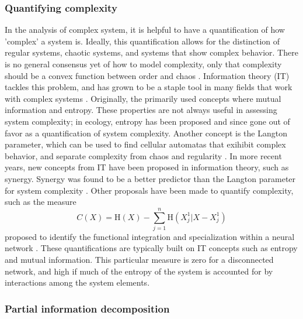 \documentclass[../main.tex]{subfiles}
\begin{document}
\subsubsection{Quantifying complexity}

In the analysis of complex system, it is helpful to have a quantification of how 'complex' a system is.
Ideally, this quantification allows for the distinction of regular systems, chaotic systems, and systems that show complex behavior.
There is no general consensus yet of how to model complexity, only that complexity should be a convex function between order and chaos \cite{bar2013computationally}.
Information theory (IT) tackles this problem, and has grown to be a staple tool in many fields that work with complex systems \cite{williams2010nonnegative}. %
Originally, the primarily used concepts where mutual information and entropy.
These properties are not always useful in assessing system complexity; in ecology, entropy has been proposed and since gone out of favor as a quantification of system complexity.
Another concept is the Langton parameter, which can be used to find cellular automatas that exihibit complex behavior, and separate complexity from chaos and regularity \cite{langton1990computation}.
In more recent years, new concepts from IT have been proposed in information theory, such as synergy.
Synergy was found to be a better predictor than the Langton parameter for system complexity \cite{9999QuaxChli}.
Other proposals have been made to quantify complexity, such as the measure
%
\begin{equation}
C(X) = \mathrm{H}(X) - \sum_{j=1}^n \mathrm{H}(X_j^1 | X - X_j^1)
\end{equation}
%
proposed to identify the functional integration and specialization within a neural network \cite{tononi1999measures}.
These quantifications are typically built on IT concepts such as entropy and mutual information.
This particular measure is zero for a disconnected network, and high if much of the entropy of the system is accounted for by interactions among the system elements.

\subsubsection{Partial information decomposition}
\end{document}
